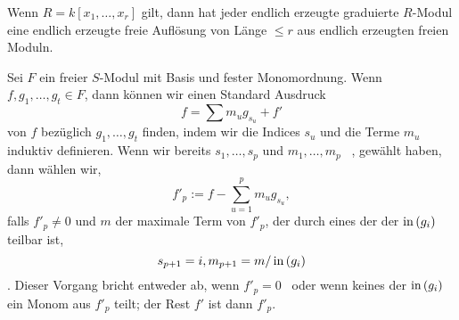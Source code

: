\documentclass{article}
\begin{document}
\maketitle
\begin{thm}
	Wenn 
	\( R = k \left[ x_1,\dots,x_r \right] \)
	gilt,
	dann hat jeder endlich erzeugte graduierte 
	\(R \)-Modul 
	eine endlich erzeugte freie Aufl\"osung von L\"ange 
	\( \le r \) 
	aus endlich erzeugten freien Moduln.
\end{thm}

\begin{algo}
	Sei 
	\( F \)
	ein freier 
	\( S\)-Modul
	mit Basis und fester Monomordnung.
	Wenn
	\( f,g_1,\dots,g_t \in F \),
	dann k\"onnen wir einen Standard Ausdruck
	\[
	        f=\sum m_u g_{s_u} +f'
	\]
	von
	\( f \)
	bez\"uglich 
	\( g_1,\dots,g_t \)
	finden,
	indem wir die Indices
	\( s_{u} \)
	und die Terme
	\(m_{u} \)
	induktiv definieren.
	Wenn wir bereits 
	\( s_1,\dots,s_p \)
	und
	\( m_1,\dots,m_p\) \ ,
	gew\"ahlt haben,
	dann w\"ahlen wir, 
	\[
		f'_p:=f-\sum_{u=1}^{p} m_u g_{s_u} ,
	\]
	falls 
	\( f'_{p} \neq 0 \)
	und
	\( m \) 
	der maximale Term von 
	\(f'_p \),
	der durch eines der der
	\( \operatorname{in}\left( g_i \right) \)
	teilbar ist,
	\[
		s_{p+1}=i , \\
		m_{p+1}=m / \operatorname{in}\left( g_i \right)
	\].
	Dieser Vorgang bricht entweder ab, wenn 
	\( f'_p=0 \) \
	oder wenn keines der
	\( \operatorname{in}\left( g_i \right) \) 
	ein Monom aus 
	\( f'_p\)
	teilt;
	der Rest 
	\(f'\) 
	ist dann 
	\( f'_p \).
\end{algo}
\end{document}
